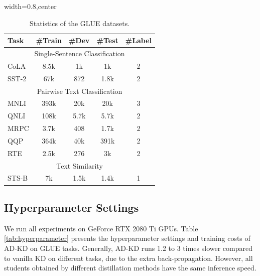 \documentclass[11pt]{article}
\begin{document}
\begin{table}[h]
        \begin{adjustbox}{width=0.8\width,center}
	\begin{tabular}{l|cccc} 
		\toprule
		Task &\#Train &\#Dev &\#Test &\#Label \\
            \hline
            \multicolumn{5}{c}{Single-Sentence Classification} \\
		\hline
            CoLA &8.5k &1k &1k &2 \\
            SST-2 &67k &872 &1.8k &2 \\
            \hline
            \multicolumn{5}{c}{Pairwise Text Classification} \\
            \hline
            MNLI &393k &20k &20k &3 \\
            QNLI &108k &5.7k &5.7k &2 \\
            MRPC &3.7k &408 &1.7k &2 \\
            QQP &364k &40k &391k &2 \\
            RTE &2.5k &276 &3k &2 \\
            \hline
            \multicolumn{5}{c}{Text Similarity} \\
            \hline
            STS-B &7k &1.5k &1.4k &1 \\
            \bottomrule
	\end{tabular}
        \end{adjustbox}
        \caption{Statistics of the GLUE datasets.}
	\label{tab:dataset}
 \vspace{-5mm}
\end{table}


\subsection{Hyperparameter Settings}\label{sec:hyper}
We run all experiments on GeForce RTX 2080 Ti GPUs. Table \ref{tab:hyperparameter} presents the hyperparameter settings and training costs of AD-KD on GLUE tasks. Generally, AD-KD runs 1.2 to 3 times slower compared to vanilla KD on different tasks, due to the extra back-propagation. However, all students obtained by different distillation methods have the same inference speed.
\end{document}
